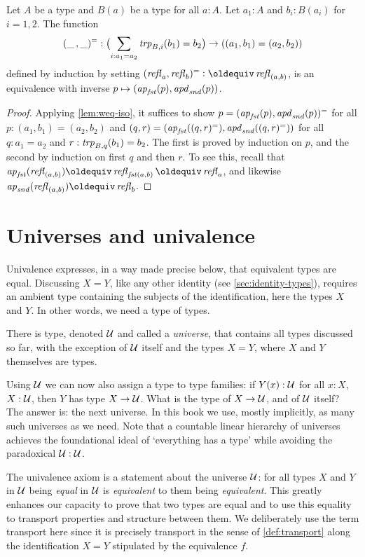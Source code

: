 \begin{lemma}\label{lem:isEq-pair=}
Let $A$ be a type and $B(a)$ be a type for all $a:A$.
Let $a_1:A$ and $b_i:B(a_i)$ for $i=1,2$. The function 
\[
(\_\,,\_)^= : 
\bigl(\sum_{i:a_1 = a_2} \mathord{\mathit{trp}}_{B,i}(b_1)= b_2\bigr) \to ((a_1,b_1)=(a_2,b_2))
\] 
defined by induction by setting $(\refl{a},\refl{b})^= \defeq \refl{(a,b)}$, 
is an equivalence with inverse $p \mapsto (\mathop{{\it ap}_{\mathop{\mathit{fst}}}}(p),\mathop{{\it apd}_{\mathop{\mathit{snd}}}}(p))$.
\end{lemma}
\begin{proof}
Applying \cref{lem:weq-iso}, it suffices to show
$p=(\mathop{{\it ap}_{\mathop{\mathit{fst}}}}(p),\mathop{{\it apd}_{\mathop{\mathit{snd}}}}(p))^=$ for all $p:(a_1,b_1)=(a_2,b_2)$ and
$(q,r)=(\mathop{{\it ap}_{\mathop{\mathit{fst}}}}((q,r)^=),\mathop{{\it apd}_{\mathop{\mathit{snd}}}}((q,r)^=))$ for all $q:a_1=a_2$
and $r:\mathord{\mathit{trp}}_{B,q}(b_1)=b_2$. The first is proved by induction on $p$, 
and the second by induction on first $q$ and then $r$. To see this,
recall that $\ap{\fst}(\refl{(a,b)})\jdeq\refl{\fst(a,b)}\jdeq\refl{a}$,
and likewise $\ap{\snd}(\refl{(a,b)})\jdeq\refl{b}$.
\end{proof}

\section{Universes and univalence}\label{sec:univax}

Univalence expresses, in a way made precise below, that
equivalent types are equal. Discussing $X = Y$, 
like any other identity (see \cref{sec:identity-types}),
requires an ambient type containing the subjects of the identification,
here the types $X$ and $Y$.
In other words, we need a type of types.

\begin{definition}\label{def:universe}
There is type, denoted $\mathcal{U}$ and called a \emph{universe}, that contains
all types discussed so far, with the exception of $\mathcal{U}$ itself and the types 
$X = Y$, where $X$ and $Y$ themselves are types.
\end{definition}

Using $\mathcal{U}$ we can now also assign a type to type families:
if $Y(x):\mathcal{U}$ for all $x:X$, $X:\mathcal{U}$, then $Y$ has type $X\to\mathcal{U}$.
What is the type of $X\to\mathcal{U}$, and of $\mathcal{U}$ itself?
The answer is: the next universe.
In this book we use, mostly implicitly, as many such universes as we need.
Note that a countable linear hierarchy of universes achieves
the foundational ideal of `everything has a type' while
avoiding the paradoxical $\mathcal{U}:\mathcal{U}$.

The univalence axiom is a statement about the universe $\mathcal{U}$: 
for all types $X$ and $Y$ in $\mathcal{U}$ being \emph{equal} in $\mathcal{U}$ is 
\emph{equivalent} to them being \emph{equivalent}. This greatly
enhances our capacity to prove that two types are equal
and to use this equality to transport properties and structure
between them. We deliberately use the term transport
here since it is precisely transport in the sense of
\cref{def:transport} along the identification
$X = Y$ stipulated by the equivalence $f$.

